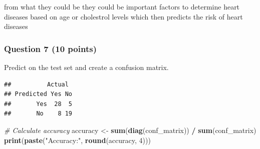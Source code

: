 \documentclass[
]{article}
\newenvironment{Shaded}{\begin{snugshade}}{\end{snugshade}}
\newcommand{\AttributeTok}[1]{\textcolor[rgb]{0.13,0.29,0.53}{#1}}
\newcommand{\CommentTok}[1]{\textcolor[rgb]{0.56,0.35,0.01}{\textit{#1}}}
\newcommand{\DecValTok}[1]{\textcolor[rgb]{0.00,0.00,0.81}{#1}}
\newcommand{\FunctionTok}[1]{\textcolor[rgb]{0.13,0.29,0.53}{\textbf{#1}}}
\newcommand{\NormalTok}[1]{#1}
\newcommand{\OtherTok}[1]{\textcolor[rgb]{0.56,0.35,0.01}{#1}}
\newcommand{\SpecialCharTok}[1]{\textcolor[rgb]{0.81,0.36,0.00}{\textbf{#1}}}
\newcommand{\StringTok}[1]{\textcolor[rgb]{0.31,0.60,0.02}{#1}}
\begin{document}
from what they could be they could be important factors to determine
heart diseases based on age or cholestrol levels which then predicts the
risk of heart diseases

\subsubsection{Question 7 (10 points)}\label{question-7-10-points}

Predict on the test set and create a confusion matrix.

\begin{Shaded}
\end{Shaded}

\begin{verbatim}
##          Actual
## Predicted Yes No
##       Yes  28  5
##       No    8 19
\end{verbatim}

\begin{Shaded}
\begin{Highlighting}[]
\CommentTok{\# Calculate accuracy}
\NormalTok{accuracy }\OtherTok{\textless{}{-}} \FunctionTok{sum}\NormalTok{(}\FunctionTok{diag}\NormalTok{(conf\_matrix)) }\SpecialCharTok{/} \FunctionTok{sum}\NormalTok{(conf\_matrix)}
\FunctionTok{print}\NormalTok{(}\FunctionTok{paste}\NormalTok{(}\StringTok{"Accuracy:"}\NormalTok{, }\FunctionTok{round}\NormalTok{(accuracy, }\DecValTok{4}\NormalTok{)))}
\end{Highlighting}
\end{Shaded}
\end{document}
